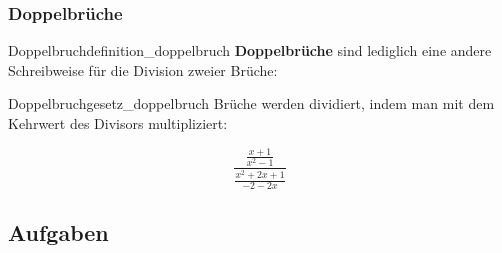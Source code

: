 \subsubsection{Doppelbrüche}



\begin{definition}{Doppelbruch}{definition_doppelbruch}
  \textbf{Doppelbrüche} sind lediglich eine andere Schreibweise für die
  Division zweier Brüche:\\

  \begin{center}
  \end{center}
\end{definition}

\begin{gesetz}{Doppelbruch}{gesetz_doppelbruch}
  Brüche werden dividiert, indem man mit dem Kehrwert des Divisors multipliziert:\\

  \begin{center}
  \end{center}
\end{gesetz}

\begin{beispiel}{}{}
$$\frac{\frac{x+1}{x^2-1}}{\frac{x^2+2x+1}{-2-2x}}$$
\end{beispiel}



\subsection*{Aufgaben}

